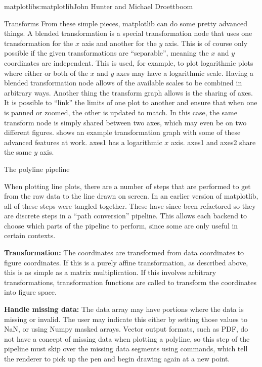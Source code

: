 \begin{aosachapter}{matplotlib}{s:matplotlib}{John Hunter and Michael Droettboom}
\begin{aosasect1}{Transforms}
From these simple pieces, matplotlib can do some pretty advanced
things.  A blended transformation is a special transformation node
that uses one transformation for the $x$ axis and another for the $y$
axis.  This is of course only possible if the given transformations
are ``separable'', meaning the $x$ and $y$ coordinates are
independent.  This is used, for example, to plot logarithmic plots
where either or both of the $x$ and $y$ axes may have a logarithmic
scale.  Having a blended transformation node allows of the available
scales to be combined in arbitrary ways.  Another thing the transform
graph allows is the sharing of axes.  It is possible to ``link'' the
limits of one plot to another and ensure that when one is panned or
zoomed, the other is updated to match.  In this case, the same
transform node is simply shared between two axes, which may even be on
two different figures.  
shows an example transformation graph with some of these advanced
features at work.  axes1 has a logarithmic $x$ axis.  axes1 and axes2
share the same $y$ axis.


\end{aosasect1}

\begin{aosasect1}{The polyline pipeline}

When plotting line plots, there are a number of steps that are
performed to get from the raw data to the line drawn on screen.  In an
earlier version of matplotlib, all of these steps were tangled
together.  These have since been refactored so they are discrete steps
in a ``path conversion'' pipeline.  This allows each backend to choose
which parts of the pipeline to perform, since some are only useful in
certain contexts.

\begin{aosaenumerate}

\item \textbf{Transformation:} The coordinates are transformed from data
  coordinates to figure coordinates.  If this is a purely affine
  transformation, as described above, this is as simple as a matrix
  multiplication.  If this involves arbitrary transformations,
  transformation functions are called to transform the coordinates
  into figure space.

\item \textbf{Handle missing data:} The data array may have portions
  where the data is missing or invalid.  The user may indicate this
  either by setting those values to NaN, or using Numpy masked arrays.
  Vector output formats, such as PDF, do not have a concept of missing
  data when plotting a polyline, so this step of the pipeline must
  skip over the missing data segments using  commands,
  which tell the renderer to pick up the pen and begin drawing again
  at a new point.


\end{aosaenumerate}
\end{aosasect1}
\end{aosachapter}
